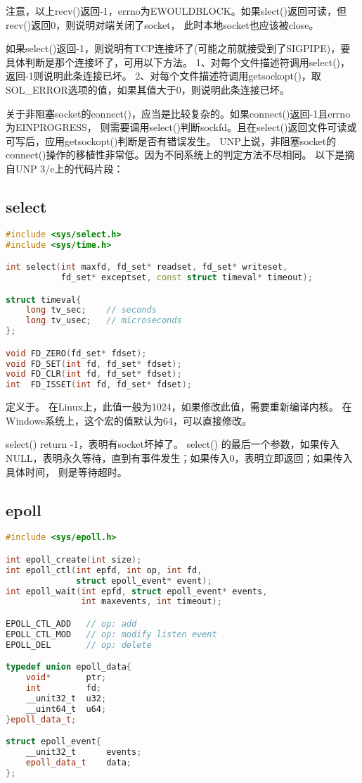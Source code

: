 注意，以上recv()返回-1，errno为EWOULDBLOCK。如果slect()返回可读，但recv()返回0，则说明对端关闭了socket，
此时本地socket也应该被close。

如果select()返回-1，则说明有TCP连接坏了(可能之前就接受到了SIGPIPE)，要具体判断是那个连接坏了，可用以下方法。
1、对每个文件描述符调用select()，返回-1则说明此条连接已坏。
2、对每个文件描述符调用getsockopt()，取SOL\_ERROR选项的值，如果其值大于0，则说明此条连接已坏。

关于非阻塞socket的connect()，应当是比较复杂的。如果connect()返回-1且errno为EINPROGRESS，
则需要调用select()判断sockfd。且在select()返回文件可读或可写后，应用getsockopt()判断是否有错误发生。
UNP上说，非阻塞socket的connect()操作的移植性非常低。因为不同系统上的判定方法不尽相同。
以下是摘自UNP 3/e上的代码片段：

\subsection{select}
\begin{lstlisting}[language=C++]
#include <sys/select.h>
#include <sys/time.h>

int select(int maxfd, fd_set* readset, fd_set* writeset, 
           fd_set* exceptset, const struct timeval* timeout);

struct timeval{
    long tv_sec;    // seconds
    long tv_usec;   // microseconds
};

void FD_ZERO(fd_set* fdset);
void FD_SET(int fd, fd_set* fdset);
void FD_CLR(int fd, fd_set* fdset);
int  FD_ISSET(int fd, fd_set* fdset);
\end{lstlisting}

定义于。
在Linux上，此值一般为1024，如果修改此值，需要重新编译内核。
在Windows系统上，这个宏的值默认为64，可以直接修改。

select() return -1，表明有socket坏掉了。
select() 的最后一个参数，如果传入NULL，表明永久等待，直到有事件发生；如果传入0，表明立即返回；如果传入具体时间，
则是等待超时。

\subsection{epoll}
\begin{lstlisting}[language=C++]
#include <sys/epoll.h>

int epoll_create(int size);
int epoll_ctl(int epfd, int op, int fd,
              struct epoll_event* event);
int epoll_wait(int epfd, struct epoll_event* events,
               int maxevents, int timeout);

EPOLL_CTL_ADD   // op: add
EPOLL_CTL_MOD   // op: modify listen event
EPOLL_DEL       // op: delete

typedef union epoll_data{
    void*       ptr;
    int         fd;
    __unit32_t  u32;
    __uint64_t  u64;
}epoll_data_t;

struct epoll_event{
    __unit32_t      events;
    epoll_data_t    data;
};
\end{lstlisting}

